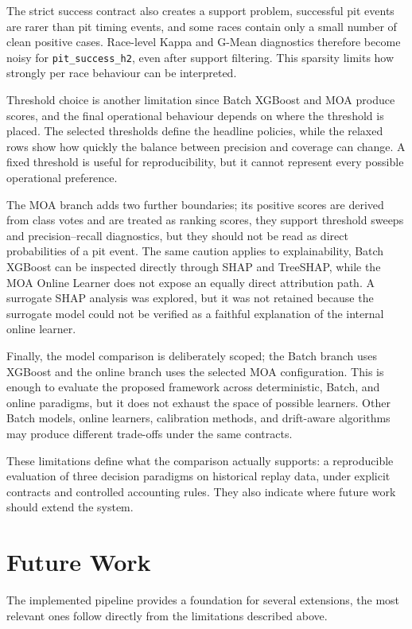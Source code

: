 The strict success contract also creates a support problem, successful pit events are rarer than pit timing events, and some races contain only a small number of clean
positive cases. Race-level Kappa and G-Mean diagnostics therefore become noisy for \texttt{pit\_success\_h2}, even after support filtering. This sparsity limits how strongly
per race behaviour can be interpreted.

Threshold choice is another limitation since Batch XGBoost and MOA produce scores, and the final operational behaviour depends on where the threshold is placed. The selected
thresholds define the headline policies, while the relaxed rows show how quickly the balance between precision and coverage can change. A fixed threshold is useful for
reproducibility, but it cannot represent every possible operational preference.

The MOA branch adds two further boundaries; its positive scores are derived from class votes and are treated as ranking scores, they support
threshold sweeps and precision--recall diagnostics, but they should not be read as direct probabilities of a pit event. The same caution applies to explainability, Batch
XGBoost can be inspected directly through SHAP and TreeSHAP, while the MOA Online Learner does not expose an equally direct attribution path. A surrogate SHAP analysis was
explored, but it was not retained because the surrogate model could not be verified as a faithful explanation of the internal online learner.

Finally, the model comparison is deliberately scoped; the Batch branch uses XGBoost and the online branch uses the selected MOA configuration. This is enough to evaluate the
proposed framework across deterministic, Batch, and online paradigms, but it does not exhaust the space of possible learners. Other Batch models, online learners, calibration
methods, and drift-aware algorithms may produce different trade-offs under the same contracts.

These limitations define what the comparison actually supports: a reproducible evaluation of three decision paradigms on historical
replay data, under explicit contracts and controlled accounting rules. They also indicate where future work should extend the system.

\section{Future Work}

The implemented pipeline provides a foundation for several extensions, the most relevant ones follow directly from the limitations described above.

